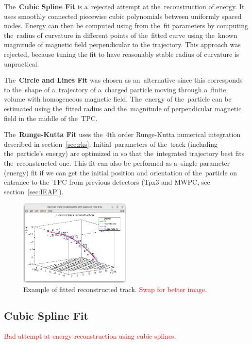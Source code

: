 \documentclass[]{article}
\begin{document}
		The~\textbf{Cubic Spline Fit} is a~rejected attempt at the~reconstruction of energy. It uses smoothly connected piecewise cubic polynomials between uniformly spaced nodes. Energy can then be computed using from the~fit parameters by computing the~radius of curvature in different points of the~fitted curve using the~known magnitude of magnetic field perpendicular to the trajectory. This approach was rejected, because tuning the fit to have reasonably stable radius of curvature is unpractical.
		
		The~\textbf{Circle and Lines Fit} was chosen as an~alternative since this corresponds to the~shape of a~trajectory of a~charged particle moving through a~finite volume with homogeneous magnetic field. The~energy of the~particle can be estimated using the~fitted radius and the~magnitude of perpendicular magnetic field in the middle of the~TPC.
		
		The~\textbf{Runge-Kutta Fit} uses the~4th order Runge-Kutta numerical integration described in section~\ref{sec:rks}. Initial~parameters of the~track (including the~particle's energy) are optimized in so that the~integrated trajectory best fits the~reconstructed one. This fit can also be performed as a~single parameter (energy) fit if we can get the initial position and orientation of the~particle on entrance to the~TPC from previous detectors (Tpx3 and MWPC, see section~\ref{sec:IEAP}).
		
		\begin{figure}
			\centering
			\includegraphics[width=0.5\textwidth]{9010_3d.png}
			\caption{Example of fitted reconstructed track. \textcolor{red}{Swap for better image.}}
			\label{fig:90103d}
		\end{figure}
		
		\subsection{Cubic Spline Fit}
			\textcolor{red}{Bad attempt at energy reconstruction using cubic splines.}
			
\end{document}
